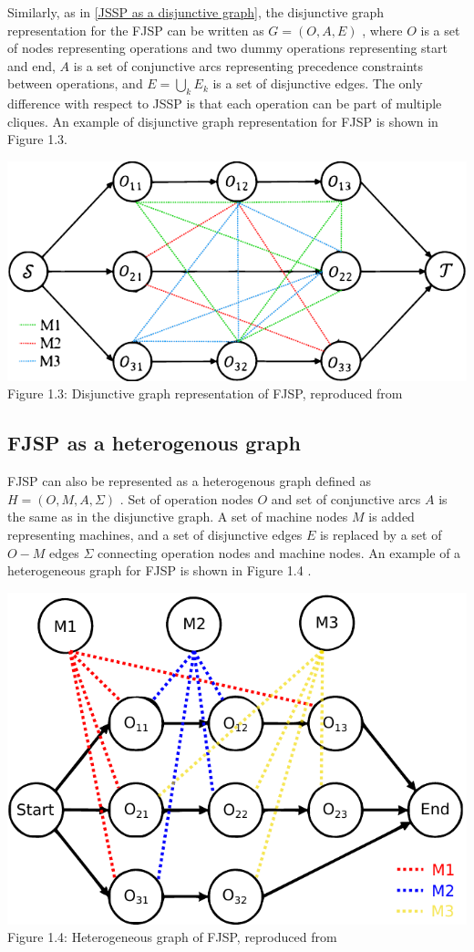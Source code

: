 Similarly, as in \ref{JSSP as a disjunctive graph}, the disjunctive graph representation for the FJSP can be written as $G = (O, A, E)$ \cite{Brandimarte_1993, 9826438, LEI2022117796}, where $O$ is a set of nodes representing operations and two dummy operations representing start and end, $A$ is a set of conjunctive arcs representing precedence constraints between operations, and $E = \bigcup_{k} E_k$ is a set of disjunctive edges. The only difference with respect to JSSP is that each operation can be part of multiple cliques. An example of disjunctive graph representation for FJSP is shown in Figure 1.3.
\begin{center}
    \includegraphics[width=0.75\linewidth]{images/fjsp_disjunctive_graph.pdf}\\
    Figure 1.3: Disjunctive graph representation of FJSP, reproduced from \cite{LEI2022117796}
\end{center}

\subsection{FJSP as a heterogenous graph}

FJSP can also be represented as a heterogenous graph defined as $H = (O, M, A, \Sigma)$ \cite{9826438}. Set of operation nodes $O$ and set of conjunctive arcs $A$ is the same as in the disjunctive graph. A set of machine nodes $M$ is added representing machines, and a set of disjunctive edges $E$ is replaced by a set of $O-M$ edges $\Sigma$ connecting operation nodes and machine nodes. An example of a heterogeneous graph for FJSP is shown in Figure 1.4 \cite{9826438}.
\begin{center}
    \includegraphics[width=0.75\linewidth]{images/fjsp_heterogenous_graph.pdf}\\
    Figure 1.4: Heterogeneous graph of FJSP, reproduced from \cite{LEI2022117796}
\end{center}


